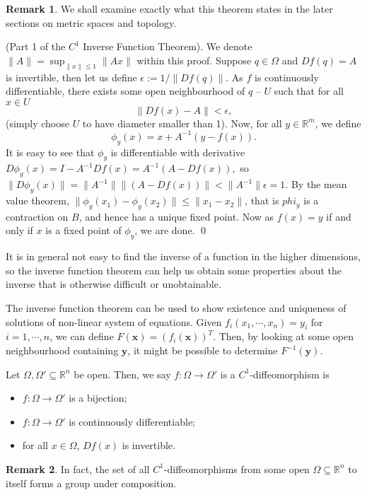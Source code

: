 \documentclass[
]{article}
\theoremstyle{definition}
\newtheorem*{remark}{Remark}
\theoremstyle{definition}
\begin{document}
\begin{remark}
  We shall examine exactly what this theorem states in the later sections on 
  metric spaces and topology.
\end{remark}

\proof (Part 1 of the \(C^1\) Inverse Function Theorem). We denote
\(\|A\| = \sup_{\|x\| \le 1} \|Ax\|\) within this proof. Suppose
\(q \in \Omega\) and \(Df(q) = A\) is invertible, then let us define
\(\epsilon := 1 / \|Df(q)\|\). As \(f\) is continuously differentiable,
there exists some open neighbourhood of \(q\) -- \(U\) such that for all
\(x \in U\) \[\|Df(x) - A\| < \epsilon,\] (simply choose \(U\) to have
diameter smaller than 1). Now, for all \(y \in \mathbb{R}^m\), we define
\[\phi_y(x) = x + A^{-1}(y - f(x)).\] It is easy to see that \(\phi_y\)
is differentiable with derivative
\(D\phi_y(x) = I - A^{-1}Df(x) = A^{-1}(A - Df(x)),\) so
\(\|D\phi_y(x)\| = \|A^{-1}\| \|(A - Df(x))\| < \|A^{-1}\|\epsilon = 1\).
By the mean value theorem,
\(\| \phi_y(x_1) - \phi_y(x_2) \| \le \| x_1 - x_2 \|\), that is
\(phi_y\) is a contraction on \(B\), and hence has a unique fixed point.
Now as \(f(x) = y\) if and only if \(x\) is a fixed point of \(\phi_y\),
we are done. \qed

It is in general not easy to find the inverse of a function in the
higher dimensions, so the inverse function theorem can help us obtain
some properties about the inverse that is otherwise difficult or
unobtainable.

The inverse function theorem can be used to show existence and
uniqueness of solutions of non-linear system of equations. Given
\(f_i(x_1, \cdots, x_n) = y_i\) for \(i = 1,\cdots , n\), we can define
\(F(\mathbf{x}) = (f_i(\mathbf{x}))^T\). Then, by looking at some open
neighbourhood containing \(\mathbf{y}\), it might be possible to
determine \(F^{-1}(\mathbf{y})\).

Let \(\Omega, \Omega' \subseteq \mathbb{R}^n\) be open. Then, we say
\(f : \Omega \to \Omega'\) is a \(C^1\)-diffeomorphism is

\begin{itemize}
  \item \(f : \Omega \to \Omega'\) is a bijection;
  \item \(f : \Omega \to \Omega'\) is continuously differentiable;
  \item for all \(x \in \Omega\), \(Df(x)\) is invertible.
\end{itemize}

\begin{remark}
  In fact, the set of all \(C^1\)-diffeomorphisms from some open 
  \(\Omega \subseteq \mathbb{R}^n\) to itself forms a group under composition.
\end{remark}
\end{document}
